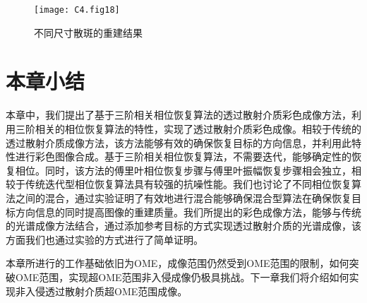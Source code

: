 \begin{figure}[htp]
	\centering
	\texttt{[image: C4.fig18]}
	\caption{不同尺寸散斑的重建结果}
	\label{fig:4.18}
\end{figure}
\section{本章小结}

本章中，我们提出了基于三阶相关相位恢复算法的透过散射介质彩色成像方法，利用三阶相关的相位恢复算法的特性，实现了透过散射介质彩色成像。相较于传统的透过散射介质成像方法，该方法能够有效的确保恢复目标的方向信息，并利用此特性进行彩色图像合成。基于三阶相关相位恢复算法，不需要迭代，能够确定性的恢复相位。同时，该方法的傅里叶相位恢复步骤与傅里叶振幅恢复步骤相会独立，相较于传统迭代型相位恢复算法具有较强的抗噪性能。我们也讨论了不同相位恢复算法之间的混合，通过实验证明了有效地进行混合能够确保混合型算法在确保恢复目标方向信息的同时提高图像的重建质量。我们所提出的彩色成像方法，能够与传统的光谱成像方法结合，通过添加参考目标的方式实现透过散射介质的光谱成像，该方面我们也通过实验的方式进行了简单证明。

本章所进行的工作基础依旧为OME，成像范围仍然受到OME范围的限制，如何突破OME范围，实现超OME范围非入侵成像仍极具挑战。下一章我们将介绍如何实现非入侵透过散射介质超OME范围成像。
